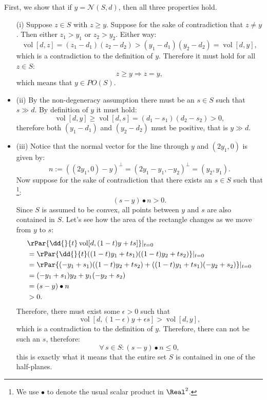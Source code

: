 \documentclass{scrartcl}
\DeclareMathOperator{\vol}{vol}
\begin{document}
First, we show that if $y=\mathcal{N}(S, d)$, then all three properties hold.
\begin{itemize}
  \item[(i)] Suppose $z\in S$ with $z\geq y$. Suppose for the sake of 
  contradiction that $z\neq y$. Then either $z_1 > y_1$ or $z_2 > y_2$.
  Either way:
  \[
    \vol[d, z] = (z_1 - d_1)(z_2 - d_2) > (y_1 - d_1)(y_2 - d_2) = \vol[d, y],
  \]
  which is a contradiction to the definition of $y$.
  Therefore it must hold for all $z\in S$:
  \[
    z\geq y \Rightarrow z = y,
  \]
  which means that $y\in PO(S)$.
  \item{(ii)} By the non-degeneracy assumption there must be an $s\in S$ such
  that $s \gg d$. By definition of $y$ it must hold:
  \[
    \vol[d, y] \geq \vol[d, s] = (d_1-s_1)(d_2-s_2) > 0,
  \]
  therefore both $(y_1 - d_1)$ and $(y_2-d_2)$ must be positive, that is
  $y\gg d$.
  \item{(iii)} Notice that the normal vector for the line through $y$ and
  $(2y_1, 0)$ is given by: 
  \[
    n := ((2y_1, 0) - y)^\perp = (2y_1-y_1, -y_2)^\perp = (y_2, y_1).
  \]
  Now 
  suppose for the sake of contradiction that there exists an $s\in S$ such that
  \footnote{
    We use $\bullet$ to denote the usual scalar product in $\Real^2$.
  }:
  \[ 
    (s - y)\bullet n > 0.
  \]
  Since $S$ is assumed to be convex, all points between $y$ and $s$ are also
  contained in $S$. Let's see how the area of the rectangle changes as we 
  move from $y$ to $s$:
  \begin{align*}
    &\rPar{\dd{}{t}\vol[d, (1-t)y + ts]}\vert_{t = 0} \\
      &\vspace{1em}=
      \rPar{\dd{}{t}((1-t)y_1 + t s_1)((1-t)y_2 + t s_2)}\vert_{t=0} \\
      \vspace{1em}
      &\vspace{1em}=
      \rPar{
        (-y_1 + s_1)((1-t)y_2 + t s_2)+((1-t)y_1 + t s_1)(-y_2 + s_2)
      }\vert_{t=0} \\
      &\vspace{1em}= 
      (-y_1 + s_1) y_2 + y_1 (-y_2 + s_2) \\
      &\vspace{1em}=
      (s-y)\bullet n \\
      &\vspace{1em}
      > 0.
  \end{align*}
  Therefore, there must exist some $\epsilon > 0$ such that 
  \[
    \vol[d, (1-\epsilon)y + \epsilon s] > \vol[d, y],
  \]
  which is a contradiction to the definition of $y$. Therefore, there can not
  be such an $s$, therefore:
  \[
    \forall\, s\in S: (s-y)\bullet n \leq 0,
  \]
  this is exactly what it means that the entire set $S$ is contained in one
  of the half-planes.
\end{itemize}
\end{document}
